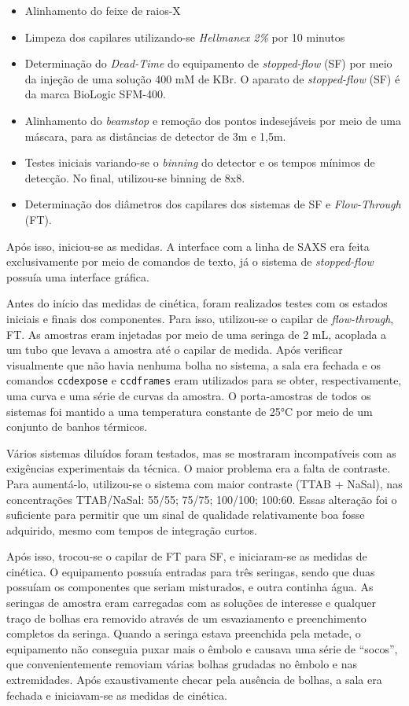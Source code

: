 			\begin{itemize}
				\item Alinhamento do feixe de raios-X
				\item Limpeza dos capilares utilizando-se \emph{Hellmanex 2\%} por 10 minutos
				\item Determinação do \emph{Dead-Time} do equipamento de \emph{stopped-flow} (SF) por meio da injeção de uma solução 400 mM de KBr. O aparato de \emph{stopped-flow} (SF) é da marca BioLogic SFM-400.
				\item Alinhamento do \emph{beamstop} e remoção dos pontos indesejáveis por meio de uma máscara, para as distâncias de detector de 3m e 1,5m.
				\item Testes iniciais variando-se o \emph{binning} do detector e os tempos mínimos de detecção. No final, utilizou-se binning de 8x8.
				\item Determinação dos diâmetros dos capilares dos sistemas de SF e \emph{Flow-Through} (FT).
			\end{itemize}
			
			Após isso, iniciou-se as medidas. A interface com a linha de SAXS era feita exclusivamente por meio de comandos de texto, já o sistema de \emph{stopped-flow} possuía uma interface gráfica.
			
			Antes do início das medidas de cinética, foram realizados testes com os estados iniciais e finais dos componentes. Para isso, utilizou-se o capilar de \emph{flow-through}, FT. As amostras eram injetadas por meio de uma seringa de 2 mL, acoplada a um tubo que levava a amostra até o capilar de medida. Após verificar visualmente que não havia nenhuma bolha no sistema, a sala era fechada e os comandos \texttt{ccdexpose} e \texttt{ccdframes} eram utilizados para se obter, respectivamente, uma curva e uma série de curvas da amostra. O porta-amostras de todos os sistemas foi mantido a uma temperatura constante de 25°C por meio de um conjunto de banhos térmicos.
			
			Vários sistemas diluídos foram testados, mas se mostraram incompatíveis com as exigências experimentais da técnica. O maior problema era a falta de contraste. Para aumentá-lo, utilizou-se o sistema com maior contraste (TTAB + NaSal), nas concentrações TTAB/NaSal: 55/55; 75/75; 100/100; 100:60. Essas alteração foi o suficiente para permitir que um sinal de qualidade relativamente boa fosse adquirido, mesmo com tempos de integração curtos.
			
			Após isso, trocou-se o capilar de FT para SF, e iniciaram-se as medidas de cinética. O equipamento possuía entradas para três seringas, sendo que duas possuíam os componentes que seriam misturados, e outra continha água. As seringas de amostra eram carregadas com as soluções de interesse e qualquer traço de bolhas era removido através de um esvaziamento e preenchimento completos da seringa. Quando a seringa estava preenchida pela metade, o equipamento não conseguia puxar mais o êmbolo e causava uma série de ``socos'', que convenientemente removiam várias bolhas grudadas no êmbolo e nas extremidades. Após exaustivamente checar pela ausência de bolhas, a sala era fechada e iniciavam-se as medidas de cinética. 
			
